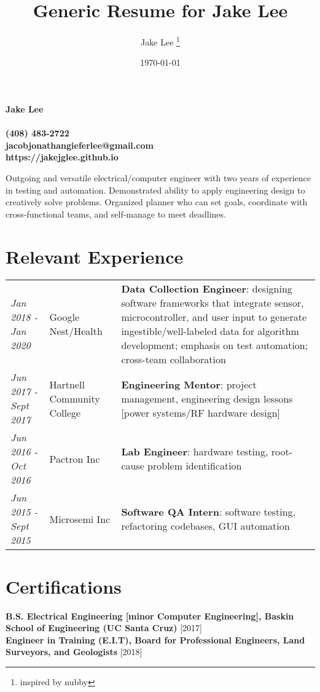 \documentclass[10pt, letterpaper]{article}
\title{Generic Resume for Jake Lee}
\author{Jake Lee \thanks{inspired by nubby}}
\date{\today}
\begin{document}
	\begin{center}
		\noindent
		\setlength{\fboxsep}{0.5cm}
		\parbox{\textwidth}{\bf 
		\Huge Jake Lee\\\\
		\small (408) 483-2722\\jacobjonathangieferlee@gmail.com\\https://jakejglee.github.io
		}
	\end{center}
	\begin{flushleft}
		\parbox{\textwidth}{
			Outgoing and versatile electrical/computer engineer with two years of experience in testing and automation. Demonstrated ability to apply engineering design to creatively solve problems. Organized planner who can set goals, coordinate with cross-functional teams, and self-manage to meet deadlines.
		}
	\end{flushleft}
	\section*{Relevant Experience}
	\begin{center}
		\begin{tabular}{ m{2cm}	 m{4cm} | m{13cm} }
			\textit{Jan 2018 - Jan 2020} & 
			Google Nest/Health\newline [via Artech Information Systems] & 
			\textbf{Data Collection Engineer}: designing software frameworks that integrate sensor, microcontroller, and user input to generate ingestible/well-labeled data for algorithm development; emphasis on test automation; cross-team collaboration\\
			\textit{Jun 2017 - Sept 2017} & 
			Hartnell Community College & 
			\textbf{Engineering Mentor}: project management, engineering design lessons [power systems/RF hardware design]\\
			\textit{Jun 2016 - Oct 2016} & 
			Pactron Inc & 
			\textbf{Lab Engineer}: hardware testing, root-cause problem identification\\
			\textit{Jun 2015 - Sept 2015} & 
			Microsemi Inc & 
			\textbf{Software QA Intern}: software testing, refactoring codebases, GUI automation
		\end{tabular}
	\end{center}
	\section*{Certifications}
	\textbf{B.S. Electrical Engineering [minor Computer Engineering], Baskin School of Engineering (UC Santa Cruz)} [2017]\\
	\textbf{Engineer in Training (E.I.T), Board for Professional Engineers, Land Surveyors, and Geologists} [2018]
\end{document}
